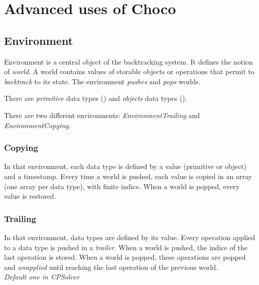 \label{advanced}
\hypertarget{advanced}{}


\chapter{Advanced uses of Choco}\label{advanced:advancedusesofchoco}\hypertarget{advanced:advancedusesofchoco}{}

\section{Environment}\label{advanced:environment}\hypertarget{advanced:environment}{}

Environment is a central object of the backtracking system. It defines the notion of \textit{world}. A world contains values of storable objects or operations that permit to \textit{backtrack} to its state. The environment \textit{pushes} and \textit{pops} worlds.

There are \textit{primitive} data types () and \textit{objects} data types ().

There are two different environments: \textit{EnvironmentTrailing} and \textit{EnvironmentCopying}.

\subsection{Copying}\label{advanced:copying}\hypertarget{advanced:copying}{}
In that environment, each data type is defined by a value (primitive or object) and a timestamp. Every time a world is pushed, each value is copied in an array (one array per data type), with finite indice. When a world is popped, every value is restored. 

\subsection{Trailing}\label{advanced:trailing}\hypertarget{advanced:trailing}{}
In that environment, data types are defined by its value. Every operation applied to a data type is pushed in a \textit{trailer}. When a world is pushed, the indice of the last operation is stored. When a world is popped, these operations are popped and \textit{unapplied} until reaching the last operation of the previous world.\\\textit{Default one in CPSolver}

